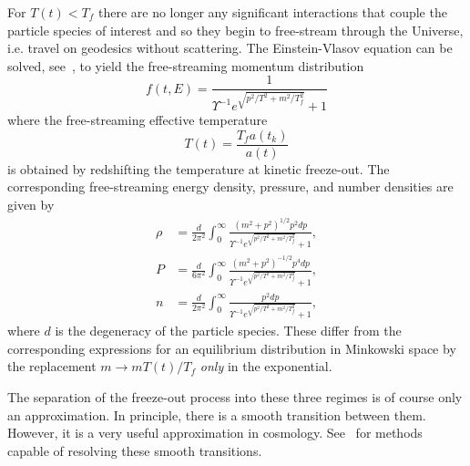 \documentclass[universe,article,submit,moreauthors,pdftex,a4paper]{Definitions/mdpi}
\begin{document}
For $T(t)<T_f$ there are no longer any significant interactions that couple the particle species of interest and so they begin to free-stream through the Universe, i.e. travel on geodesics without scattering. The Einstein-Vlasov equation can be solved, see~\cite{choquet2008general}, to yield the free-streaming momentum distribution
\begin{equation}\label{free_stream_dist}
f(t,E)=\frac{1}{\Upsilon^{-1}e^{\sqrt{p^2/T^2+m^2 /T_f^2}}+ 1}
\end{equation}
where the free-streaming effective temperature
\begin{equation}\label{T_freestream_dist}
T(t)=\frac{T_fa(t_k)}{a(t)}
\end{equation}
is obtained by redshifting the temperature at kinetic freeze-out. The corresponding free-streaming energy density, pressure, and number densities are given by
\begin{align}
\rho&=\frac{d}{2\pi^2}\!\int_0^\infty\!\!\!\frac{\left(m^2+p^2\right)^{1/2}p^2dp }{\Upsilon^{-1}e^{\sqrt{p^2/T^2+m^2/T_f^2}}+ 1},\label{freestream_rho}\\[0.2cm]
P&=\frac{d}{6\pi^2}\!\int_0^\infty\!\!\!\frac{\left(m^2+p^2\right)^{-1/2}p^4dp }{\Upsilon^{-1} e^{\sqrt{p^2/T^2+m^2/T_f^2}}+ 1},\label{freestream_P}\\[0.2cm]
n&=\frac{d}{2\pi^2}\!\int_0^\infty\!\!\!\frac{p^2dp }{\Upsilon^{-1}e^{\sqrt{p^2/T^2+m^2/T_f^2}}+ 1},
\label{num_density}
\end{align}
where $d$ is the degeneracy of the particle species. These differ from the corresponding expressions for an equilibrium distribution in Minkowski space by the replacement $m\rightarrow m T(t)/T_f$ {\em only} in the exponential. 

The separation of the freeze-out process into these three regimes is of course only an approximation. In principle, there is a smooth transition between them. However, it is a very useful approximation in cosmology. See~\cite{Mangano:2005cc,Birrell:2014gea} for methods capable of resolving these smooth transitions.
\end{document}
